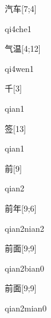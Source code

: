\begin{verbete}[qi4che1]{汽车}[7;4]
\begin{pronuncia}{qi4che1}
\end{pronuncia}
\end{verbete}

\begin{verbete}[qi4wen1]{气温}[4;12]
\begin{pronuncia}{qi4wen1}
\end{pronuncia}
\end{verbete}

\begin{verbete}[qian1]{千}[3]
\begin{pronuncia}{qian1}
\end{pronuncia}
\end{verbete}

\begin{verbete}[qian1]{签}[13]
\begin{pronuncia}{qian1}
\end{pronuncia}
\end{verbete}

\begin{verbete}[qian2]{前}[9]
\begin{pronuncia}{qian2}
\end{pronuncia}
\end{verbete}

\begin{verbete}{前年}[9;6]
\begin{pronuncia}{qian2nian2}
\end{pronuncia}
\end{verbete}

\begin{verbete}{前面}[9;9]
\begin{pronuncia}{qian2bian0}
\end{pronuncia}
\end{verbete}

\begin{verbete}{前面}[9;9]
\begin{pronuncia}{qian2mian0}
\end{pronuncia}
\end{verbete}

